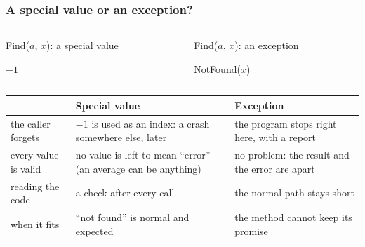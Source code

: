 \documentclass[aspectratio=169,10pt,compress]{beamer}
\begin{document}
\begin{frame}[t,fragile] \frametitle{A special value or an exception?}
	\begin{columns}[T]
		\begin{column}{0.48\textwidth}


\begin{algorithm}[H]
				\caption{Find($a$, $x$): a special value}
				\Return $-1$ 
\end{algorithm}

		\end{column}
		\begin{column}{0.48\textwidth}


\begin{algorithm}[H]
				\caption{Find($a$, $x$): an exception}
				\KwThrow NotFound($x$)\;
\end{algorithm}

		\end{column}
	\end{columns}


\begin{table}
		\footnotesize
		\begin{tabular}{@{}L{0.20\textwidth}L{0.36\textwidth}L{0.36\textwidth}@{}}
			\toprule
			& \textbf{Special value} & \textbf{Exception} \\
			\midrule
			the caller forgets   & $-1$ is used as an index: a crash somewhere else, later & the program stops right here, with a report \\
			every value is valid & no value is left to mean ``error'' (an average can be anything) & no problem: the result and the error are apart \\
			reading the code     & a check after every call                                & the normal path stays short \\
			when it fits         & ``not found'' is normal and expected                     & the method cannot keep its promise \\
			\bottomrule
		\end{tabular}
\end{table}%
\end{frame}
\end{document}
